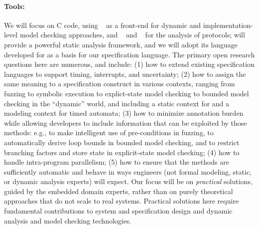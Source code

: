 \paragraph{Tools:} We will focus on C code, using \deepstate~\cite{DeepState}
as a front-end for dynamic and implementation-level model checking approaches, and
\uppaal~\cite{uppaal} and
\prism~\cite{KNP2011:CAV} for the analysis of protocols; \framac will
provide a powerful static analysis framework, and we will adopt its
\acsl language developed for \framac as a basis for our specification language.  The primary open research questions here are numerous, and include:
(1) how to extend existing specification languages to support timing, interrupts,
and uncertainty;
(2) how to assign the same meaning to a specification construct in
  various contexts, ranging from fuzzing to symbolic execution to
  explict-state model checking to bounded model checking in the
  ``dynamic'' \deepstate world, and including a static context for
  \framac and a modeling context for timed automata;
(3) how to minimize annotation burden while allowing developers to
include information that can be exploited by those methods: e.g., to
make intelligent use of pre-conditions in fuzzing, to automatically
derive loop bounds in bounded model checking, and to restrict
branching factors and store state in explicit-state model checking;
(4) how to handle intra-program parallelism;
(5) how to ensure that the methods are sufficiently automatic
  and behave in ways engineers (not formal modeling, static, or dynamic
  analysis experts) will expect.
Our focus will be on \emph{practical} solutions, guided by the
embedded domain experts, rather than on purely theoretical approaches
that do not scale to real systems. Practical solutions here require
fundamental contributions to system and specification design and
dynamic analysis and model checking technologies.